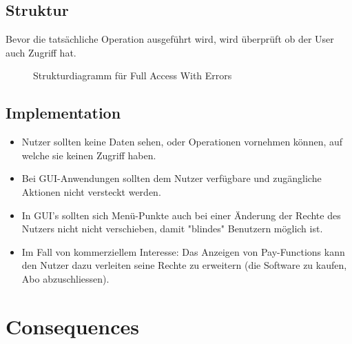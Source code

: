 \subsection{Struktur}
Bevor die tatsächliche Operation ausgeführt wird, wird überprüft ob der User auch Zugriff hat.

\begin{figure}[H]
  \centering
  
  \caption{Strukturdiagramm f\"ur Full Access With Errors}
\end{figure}

\subsection{Implementation}
\begin{itemize}
  \item Nutzer sollten keine Daten sehen, oder Operationen vornehmen können, auf welche sie keinen Zugriff haben.
  \item Bei GUI-Anwendungen sollten dem Nutzer verfügbare und zugängliche Aktionen nicht versteckt werden.
  \item In GUI's sollten sich Menü-Punkte auch bei einer Änderung der Rechte des Nutzers nicht nicht verschieben, damit "blindes" Benutzern möglich ist.
  \item Im Fall von kommerziellem Interesse: Das Anzeigen von Pay-Functions kann den Nutzer dazu verleiten seine Rechte zu erweitern (die Software zu kaufen, Abo abzuschliessen).
\end{itemize}

\section{Consequences}
\begin{itemize}
\end{itemize}

